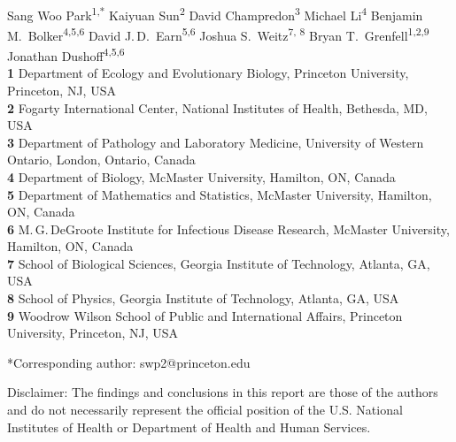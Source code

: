 \documentclass[12pt]{article}
\date{\today}
\providecommand{\DIFaddbegin}{} %
\providecommand{\DIFaddend}{} %
\providecommand{\DIFdelbegin}{} %
\providecommand{\DIFdelend}{} %
\newcommand{\DIFscaledelfig}{0.5}
\newlength{\DIFdelgraphicswidth} %
\newlength{\DIFdelgraphicsheight} %
\newcommand{\DIFaddincludegraphics}[2][]{{\color{blue}\fbox{\DIFOincludegraphics[#1]{#2}}}} %
\newcommand{\DIFdelincludegraphics}[2][]{%
\sbox{\DIFdelgraphicsbox}{\DIFOincludegraphics[#1]{#2}}%
\settoboxwidth{\DIFdelgraphicswidth}{\DIFdelgraphicsbox} %
\settoboxtotalheight{\DIFdelgraphicsheight}{\DIFdelgraphicsbox} %
\scalebox{\DIFscaledelfig}{%
\parbox[b]{\DIFdelgraphicswidth}{\usebox{\DIFdelgraphicsbox}\\[-\baselineskip] \rule{\DIFdelgraphicswidth}{0em}}\llap{\resizebox{\DIFdelgraphicswidth}{\DIFdelgraphicsheight}{%
\setlength{\unitlength}{\DIFdelgraphicswidth}%
\begin{picture}(1,1)%
\thicklines\linethickness{2pt} %
{\color[rgb]{1,0,0}\put(0,0){\framebox(1,1){}}}%
{\color[rgb]{1,0,0}\put(0,0){\line( 1,1){1}}}%
{\color[rgb]{1,0,0}\put(0,1){\line(1,-1){1}}}%
\end{picture}%
}\hspace*{3pt}}} %
} %
\DeclareRobustCommand{\DIFaddbegin}{\DIFOaddbegin \let\includegraphics\DIFaddincludegraphics} %
\DeclareRobustCommand{\DIFaddend}{\DIFOaddend \let\includegraphics\DIFOincludegraphics} %
\DeclareRobustCommand{\DIFdelbegin}{\DIFOdelbegin \let\includegraphics\DIFdelincludegraphics} %
\DeclareRobustCommand{\DIFdelend}{\DIFOaddend \let\includegraphics\DIFOincludegraphics} %
\begin{document}
\DIFdelbegin %
\DIFdelend \DIFaddbegin \begin{flushleft}{
	\Large
	\textbf{}
}
\DIFaddend \newline
\\
Sang Woo Park\textsuperscript{1,*}
Kaiyuan Sun\textsuperscript{2}
David Champredon\textsuperscript{3}
Michael Li\textsuperscript{4}
Benjamin M.\ Bolker\textsuperscript{4,5,6}
David J.\,D.\ Earn\textsuperscript{5,6}
Joshua S.\ Weitz\textsuperscript{7, 8}
Bryan T.\ Grenfell\textsuperscript{1,2,9}
Jonathan Dushoff\textsuperscript{4,5,6}
\\
\bigskip
\textbf{1} Department of Ecology and Evolutionary Biology, Princeton University, Princeton, NJ, USA
\\
\textbf{2} Fogarty International Center, National Institutes of Health, Bethesda, MD, USA
\\
\textbf{3} Department of Pathology and Laboratory Medicine, University of Western Ontario, London, Ontario, Canada
\\
\textbf{4} Department of Biology, McMaster University, Hamilton, ON, Canada
\\
\textbf{5} Department of Mathematics and Statistics, McMaster University, Hamilton, ON, Canada
\\
\textbf{6} M.\,G.\,DeGroote Institute for Infectious Disease Research, McMaster University, Hamilton, ON, Canada
\\
\textbf{7} School of Biological Sciences, Georgia Institute of Technology, Atlanta, GA, USA
\\
\textbf{8} School of Physics, Georgia Institute of Technology, Atlanta, GA, USA
\\
\textbf{9} Woodrow Wilson School of Public and International Affairs, Princeton University, Princeton, NJ, USA
\\
\bigskip

*Corresponding author: swp2@princeton.edu
\bigskip

Disclaimer: The findings and conclusions in this report are those of the authors and do not necessarily represent the official position of the U.S. National Institutes of Health or Department of Health and Human Services.
\end{flushleft}
\end{document}
